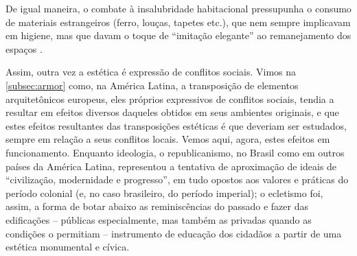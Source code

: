 De igual maneira, o combate à insalubridade habitacional pressupunha o consumo de materiais estrangeiros (ferro, louças, tapetes etc.), que nem sempre implicavam em higiene, mas que davam o toque de ``imitação elegante'' ao remanejamento dos espaços \cite[p.~38]{sodre_terreiro_1988}.

Assim, outra vez a estética é expressão de conflitos sociais. Vimos na \autoref{subsec:armor} como, na América Latina, a transposição de elementos arquitetônicos europeus, eles próprios expressivos de conflitos sociais, tendia a resultar em efeitos diversos daqueles obtidos em seus ambientes originais, e que estes efeitos resultantes das transposições estéticas é que deveriam ser estudados, sempre em relação a seus conflitos locais. Vemos aqui, agora, estes efeitos em funcionamento. Enquanto ideologia, o republicanismo, no Brasil como em outros países da América Latina, representou a tentativa de aproximação de ideais de ``civilização, modernidade e progresso'', em tudo opostos aos valores e práticas do período colonial (e, no caso brasileiro, do período imperial); o ecletismo foi, assim, a forma de botar abaixo as reminiscências do passado e fazer das edificações -- públicas especialmente, mas também as privadas quando as condições o permitiam -- instrumento de educação dos cidadãos a partir de uma estética monumental e cívica. 

